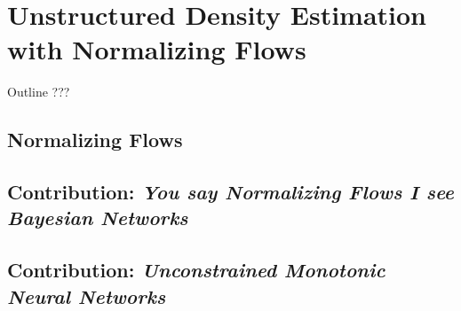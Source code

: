 \chapter{Unstructured Density Estimation with Normalizing Flows}\label{ch:04}

\begin{remark}{Outline}
???
\end{remark}

\section{Normalizing Flows}

\section{Contribution: \textit{You say Normalizing Flows I see Bayesian Networks}}

\section{Contribution: \textit{Unconstrained Monotonic Neural Networks}}
